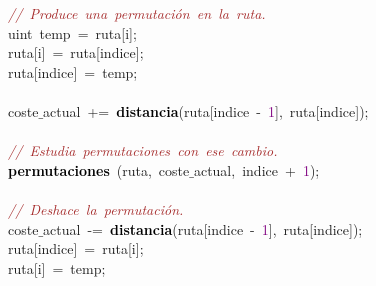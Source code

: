 \mbox{} \\
\mbox{} \\
\mbox{}\ \ \ \ \ \ \ \ \ \ \ \ \textit{\textcolor{Brown}{//\ Produce\ una\ permutación\ en\ la\ ruta.}} \\
\mbox{}\ \ \ \ \ \ \ \ \ \ \ \ \textcolor{TealBlue}{uint}\ temp\ \textcolor{BrickRed}{=}\ ruta\textcolor{BrickRed}{[}i\textcolor{BrickRed}{];} \\
\mbox{}\ \ \ \ \ \ \ \ \ \ \ \ ruta\textcolor{BrickRed}{[}i\textcolor{BrickRed}{]}\ \textcolor{BrickRed}{=}\ ruta\textcolor{BrickRed}{[}indice\textcolor{BrickRed}{];} \\
\mbox{}\ \ \ \ \ \ \ \ \ \ \ \ ruta\textcolor{BrickRed}{[}indice\textcolor{BrickRed}{]}\ \textcolor{BrickRed}{=}\ temp\textcolor{BrickRed}{;} \\
\mbox{}\ \ \ \ \ \ \ \ \ \ \ \  \\
\mbox{}\ \ \ \ \ \ \ \ \ \ \ \ coste$\_$actual\ \textcolor{BrickRed}{+=}\ \textbf{\textcolor{Black}{distancia}}\textcolor{BrickRed}{(}ruta\textcolor{BrickRed}{[}indice\ \textcolor{BrickRed}{-}\ \textcolor{Purple}{1}\textcolor{BrickRed}{],}\ ruta\textcolor{BrickRed}{[}indice\textcolor{BrickRed}{]);} \\
\mbox{}\ \ \ \ \ \ \ \ \ \ \ \  \\
\mbox{}\ \ \ \ \ \ \ \ \ \ \ \ \textit{\textcolor{Brown}{//\ Estudia\ permutaciones\ con\ ese\ cambio.}} \\
\mbox{}\ \ \ \ \ \ \ \ \ \ \ \ \textbf{\textcolor{Black}{permutaciones}}\ \textcolor{BrickRed}{(}ruta\textcolor{BrickRed}{,}\ coste$\_$actual\textcolor{BrickRed}{,}\ indice\ \textcolor{BrickRed}{+}\ \textcolor{Purple}{1}\textcolor{BrickRed}{);} \\
\mbox{}\ \ \ \ \ \ \ \ \ \ \ \  \\
\mbox{}\ \ \ \ \ \ \ \ \ \ \ \ \textit{\textcolor{Brown}{//\ Deshace\ la\ permutación.}} \\
\mbox{}\ \ \ \ \ \ \ \ \ \ \ \ coste$\_$actual\ \textcolor{BrickRed}{-=}\ \textbf{\textcolor{Black}{distancia}}\textcolor{BrickRed}{(}ruta\textcolor{BrickRed}{[}indice\ \textcolor{BrickRed}{-}\ \textcolor{Purple}{1}\textcolor{BrickRed}{],}\ ruta\textcolor{BrickRed}{[}indice\textcolor{BrickRed}{]);} \\
\mbox{}\ \ \ \ \ \ \ \ \ \ \ \ ruta\textcolor{BrickRed}{[}indice\textcolor{BrickRed}{]}\ \textcolor{BrickRed}{=}\ ruta\textcolor{BrickRed}{[}i\textcolor{BrickRed}{];} \\
\mbox{}\ \ \ \ \ \ \ \ \ \ \ \ ruta\textcolor{BrickRed}{[}i\textcolor{BrickRed}{]}\ \textcolor{BrickRed}{=}\ temp\textcolor{BrickRed}{;} \\
